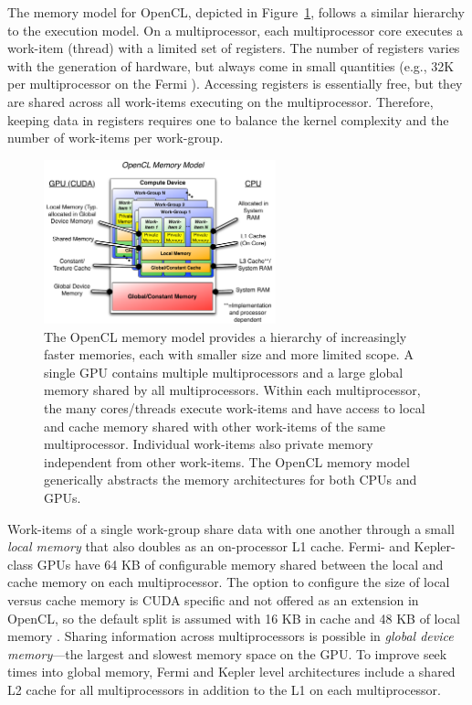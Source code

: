 \documentclass{report}
\begin{document}
The memory model for OpenCL, depicted in Figure~\ref{fig:opencl_memory_model}, follows a similar hierarchy to the execution model. On a multiprocessor, each multiprocessor core executes a work-item (thread) with a limited set of registers. The number of registers varies with the generation of hardware, but always come in small quantities (e.g., 32K per multiprocessor on the Fermi \cite{CudaGuide2013}). Accessing registers is essentially free, but they are shared across all work-items executing on the multiprocessor. Therefore, keeping data in registers requires one to balance the kernel complexity and the number of work-items per work-group. 


\begin{figure}
\centering
\includegraphics[width=0.6\textwidth]{../figures/prospectus/opencl_memory_model.pdf}
\caption{The OpenCL memory model provides a hierarchy of increasingly faster memories, each with smaller size and more limited scope. A single GPU contains multiple multiprocessors and a large global memory shared by all multiprocessors. Within each multiprocessor, the many cores/threads execute work-items and have access to local and cache memory shared with other work-items of the same multiprocessor. Individual work-items also private memory independent from other work-items. The OpenCL memory model generically abstracts the memory architectures for both CPUs and GPUs.} 
\label{fig:opencl_memory_model}
\end{figure}

Work-items of a single work-group share data with one another through a small \textit{local memory} that also doubles as an on-processor L1 cache. Fermi- and Kepler-class GPUs have 64 KB of configurable memory shared between the local and cache memory on each multiprocessor. The option to configure the size of local versus cache memory is CUDA specific and not offered as an extension in OpenCL, so the default split is assumed with 16 KB in cache and 48 KB of local memory \cite{CudaGuide2013}.
Sharing information across multiprocessors is possible in \textit{global device memory}---the largest and slowest memory space on the GPU. To improve seek times into global memory, Fermi and Kepler level architectures include a shared L2 cache for all multiprocessors in addition to the L1 on each multiprocessor. 
\end{document}
